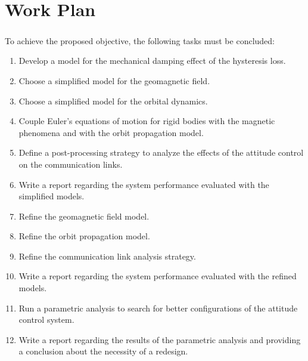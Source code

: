 %
%
%
%
%

%
%
%
%
%
%

\chapter{Work Plan} \label{ch:work-plan}

\paragraph{}
\indent 
   To achieve the proposed objective, the following tasks must be concluded:
   
   \begin{enumerate}
   	\item Develop a model for the mechanical damping effect of the hysteresis loss.
   	\item Choose a simplified model for the geomagnetic field.
   	\item Choose a simplified model for the orbital dynamics.
   	\item Couple Euler's equations of motion for rigid bodies with the magnetic phenomena and with the orbit propagation model.
   	\item Define a post-processing strategy to analyze the effects of the attitude control on the communication links.
   	\item Write a report regarding the system performance evaluated with the simplified models.
   	\item Refine the geomagnetic field model.
   	\item Refine the orbit propagation model.
   	\item Refine the communication link analysis strategy.
   	\item Write a report regarding the system performance evaluated with the refined models.
   	\item Run a parametric analysis to search for better configurations of the attitude control system.
   	\item Write a report regarding the results of the parametric analysis and providing a conclusion about the necessity of a redesign.
   \end{enumerate}